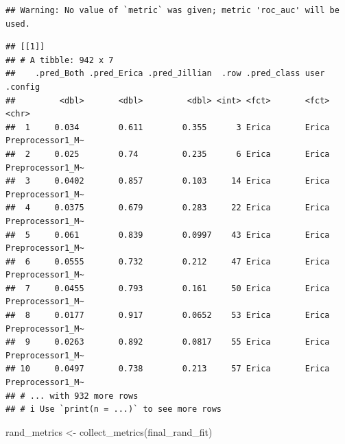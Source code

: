 \documentclass[
]{article}
\newenvironment{Shaded}{\begin{snugshade}}{\end{snugshade}}
\newcommand{\CommentTok}[1]{\textcolor[rgb]{0.56,0.35,0.01}{\textit{#1}}}
\newcommand{\FunctionTok}[1]{\textcolor[rgb]{0.00,0.00,0.00}{#1}}
\newcommand{\NormalTok}[1]{#1}
\newcommand{\OtherTok}[1]{\textcolor[rgb]{0.56,0.35,0.01}{#1}}
\newcommand{\SpecialCharTok}[1]{\textcolor[rgb]{0.00,0.00,0.00}{#1}}
\begin{document}
\begin{verbatim}
## Warning: No value of `metric` was given; metric 'roc_auc' will be used.
\end{verbatim}

\begin{Shaded}
\end{Shaded}

\begin{verbatim}
## [[1]]
## # A tibble: 942 x 7
##    .pred_Both .pred_Erica .pred_Jillian  .row .pred_class user  .config         
##         <dbl>       <dbl>         <dbl> <int> <fct>       <fct> <chr>           
##  1     0.034        0.611        0.355      3 Erica       Erica Preprocessor1_M~
##  2     0.025        0.74         0.235      6 Erica       Erica Preprocessor1_M~
##  3     0.0402       0.857        0.103     14 Erica       Erica Preprocessor1_M~
##  4     0.0375       0.679        0.283     22 Erica       Erica Preprocessor1_M~
##  5     0.061        0.839        0.0997    43 Erica       Erica Preprocessor1_M~
##  6     0.0555       0.732        0.212     47 Erica       Erica Preprocessor1_M~
##  7     0.0455       0.793        0.161     50 Erica       Erica Preprocessor1_M~
##  8     0.0177       0.917        0.0652    53 Erica       Erica Preprocessor1_M~
##  9     0.0263       0.892        0.0817    55 Erica       Erica Preprocessor1_M~
## 10     0.0497       0.738        0.213     57 Erica       Erica Preprocessor1_M~
## # ... with 932 more rows
## # i Use `print(n = ...)` to see more rows
\end{verbatim}

\begin{Shaded}
\begin{Highlighting}[]
\NormalTok{rand\_metrics }\OtherTok{\textless{}{-}} \FunctionTok{collect\_metrics}\NormalTok{(final\_rand\_fit)}
\end{Highlighting}
\end{Shaded}
\end{document}
